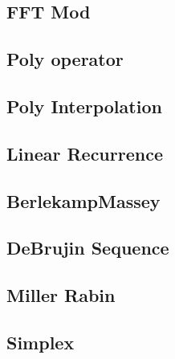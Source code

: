 \documentclass[a4paper,10pt,twocolumn,oneside]{article}
\begin{document}
\subsection{FFT Mod}


\subsection{Poly operator}


\subsection{Poly Interpolation}


%

\subsection{Linear Recurrence}


\subsection{BerlekampMassey}


\subsection{DeBrujin Sequence}


\subsection{Miller Rabin}


%

\subsection{Simplex}

\end{document}
